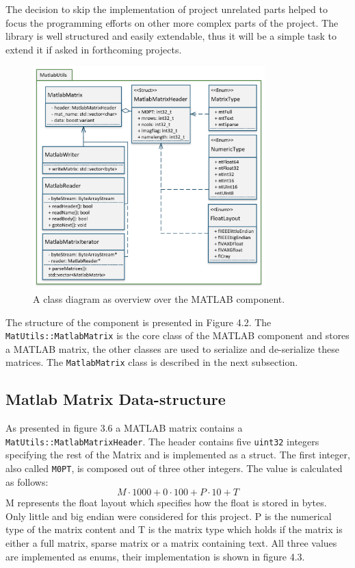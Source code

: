 The decision to skip the implementation of project unrelated parts helped to focus the programming efforts on other more complex parts of the project. The library is well structured and easily extendable, thus it will be a simple task to extend it if asked in forthcoming projects.
\begin{figure}[h]
\centering
      \includegraphics[width=0.8\textwidth]{mlab}
        \caption{A class diagram as overview over the MATLAB component.}
\end{figure}
The structure of the component is presented in Figure 4.2. The \texttt{MatUtils::MatlabMatrix} is the core class of the MATLAB component and stores a MATLAB matrix, the other classes are used to serialize and de-serialize these matrices. The \texttt{MatlabMatrix} class is described in the next subsection.
\subsection{Matlab Matrix Data-structure}
As presented in figure 3.6 a MATLAB matrix contains a \texttt{MatUtils::MatlabMatrixHeader}. The header contains five \texttt{uint32} integers specifying the rest of the Matrix and is implemented as a struct. The first integer, also called \texttt{M0PT}, is composed out of three other integers. The value is calculated as follows:
$$M\cdot1000 + 0 \cdot 100 + P\cdot 10 + T$$
M represents the float layout which specifies how the float is stored in bytes. Only little and big endian were considered for this project. P is the numerical type of the matrix content and T is the matrix type which holds if the matrix is either a full matrix, sparse matrix or a matrix containing text. All three values are implemented as enums, their implementation is shown in figure 4.3.

